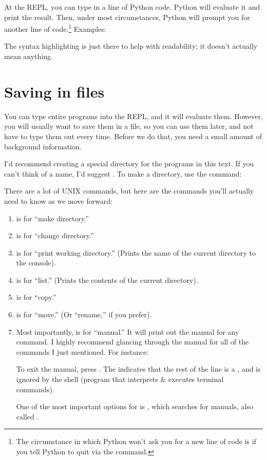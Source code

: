 At the REPL, you can type in a line of Python code. Python will
evaluate it and print the result. Then, under most circumstances,
Python will prompt you for another line of code.\footnote{The
  circumstance in which Python won't ask you for a new line of code is
  if you tell Python to quit via the  command.} Examples:


\begin{remark}
  The syntax highlighting is just there to help with readability; it
  doesn't actually mean anything.
\end{remark}

\section{Saving in files}

You can type entire programs into the REPL, and it will evaluate
them. However, you will usually want to save them in a file, so you
can use them later, and not have to type them out every time. Before
we do that, you need a small amount of background information.

I'd recommend creating a special directory for the programs in this
text. If you can't think of a name, I'd suggest . To make a
directory, use the  command:


There are a lot of UNIX commands, but here are the commands you'll
actually need to know as we move forward:

\begin{enumerate}
\item {} is for ``make directory.''
\item {} is for ``change directory.''
\item {} is for ``print working directory.'' (Prints the name
  of the current directory to the console).
\item {} is for ``list.'' (Prints the contents of the current
  directory).
\item {} is for ``copy.''
\item {} is for ``move.'' (Or ``rename,'' if you prefer).
\item Most importantly,  is for ``manual.'' It will print
  out the manual for any command. I highly recommend glancing through
  the manual for all of the commands I just mentioned. For instance:


  To exit the manual, press . The \code{#} indicates that the
  rest of the line is a , and is ignored by the shell
  (program that interprets \& executes terminal commands).

  One of the most important options for  is ,
  which searches for manuals, also called .

\end{enumerate}


